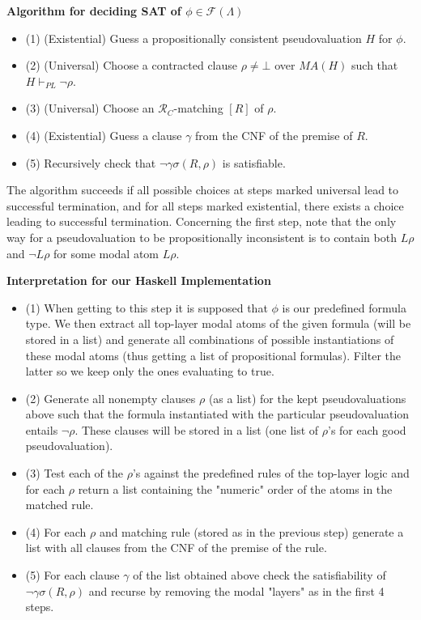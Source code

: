 \documentclass[11pt,final,notitlepage,onecolumn]{article}%
\date{}
\begin{document}
{\bf Algorithm for deciding SAT of $\phi\in\mathcal{F}(\Lambda)$}
\begin{itemize}
\item (1) (Existential) Guess a propositionally consistent pseudovaluation $H$ for $\phi$.
\item (2) (Universal) Choose a contracted clause $\rho\neq\bot$ over $MA(H)$ such that $H\vdash_{PL}\neg\rho$.
\item (3) (Universal) Choose an $\mathcal{R}_C$-matching $[R]$ of $\rho$.
\item (4) (Existential) Guess a clause $\gamma$ from the CNF of the premise of $R$.
\item (5) Recursively check that $\neg\gamma\sigma(R,\rho)$ is satisfiable.
\end{itemize}
The algorithm succeeds if all possible choices at steps marked universal lead to successful termination, and for all steps marked existential, there exists a choice leading to successful termination. Concerning the first step, note that the only way for a pseudovaluation to be propositionally inconsistent is to contain both $L\rho$ and $\neg L\rho$ for some modal atom $L\rho$.

\bigskip

{\bf Interpretation for our Haskell Implementation}
\begin{itemize}
\item (1) When getting to this step it is supposed that $\phi$ is our predefined formula type. We then extract all top-layer modal atoms of the given formula (will be stored in a list) and generate all combinations of possible instantiations of these modal atoms (thus getting a list of propositional formulas). Filter the latter so we keep only the ones evaluating to true.
\item (2) Generate all nonempty clauses $\rho$ (as a list) for the kept pseudovaluations above such that the formula instantiated with the particular pseudovaluation entails $\neg\rho$. These clauses will be stored in a list (one list of $\rho$'s for each good pseudovaluation).
\item (3) Test each of the $\rho$'s against the predefined rules of the top-layer logic and for each $\rho$ return a list containing the "numeric" order of the atoms in the matched rule.
\item (4) For each $\rho$ and matching rule (stored as in the previous step) generate a list with all clauses from the CNF of the premise of the rule.
\item (5) For each clause $\gamma$ of the list obtained above check the satisfiability of $\neg\gamma\sigma(R,\rho)$ and recurse by removing the modal "layers" as in the first 4 steps.
\end{itemize}

\bigskip
\end{document}
